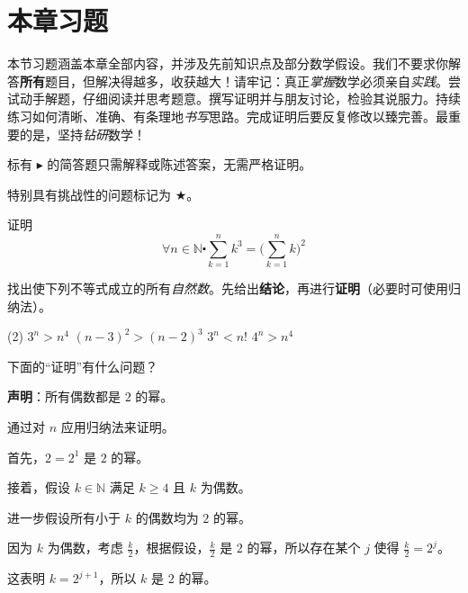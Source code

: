 \section{本章习题} \label{sec:section5.7}

本节习题涵盖本章全部内容，并涉及先前知识点及部分数学假设。我们不要求你解答\textbf{所有}题目，但解决得越多，收获越大！请牢记：真正\emph{掌握}数学必须亲自\emph{实践}。尝试动手解题，仔细阅读并思考题意。撰写证明并与朋友讨论，检验其说服力。持续练习如何清晰、准确、有条理地\emph{书写}思路。完成证明后要反复修改以臻完善。最重要的是，坚持\emph{钻研}数学！

标有 $\blacktriangleright$ 的简答题只需解释或陈述答案，无需严格证明。

特别具有挑战性的问题标记为 $\bigstar$。\\

\begin{exercise} \label{exc:exercises5.7.1}
    证明
    \[\forall n \in \mathbb{N} \centerdot \sum_{k=1}^{n} k^3 = \bigg(\sum_{k=1}^{n} k\bigg)^2\]
\end{exercise}

\begin{exercise}
    找出使下列不等式成立的所有\emph{自然数}。先给出\textbf{结论}，再进行\textbf{证明}（必要时可使用归纳法）。
    \begin{tasks}[label=(\alph*)](2)
        \task $3^n > n^4$
        \task $(n-3)^2 > (n-2)^3$
        \task $3^n < n!$
        \task $4^n > n^4$
    \end{tasks}
\end{exercise}

\begin{exercise}
    下面的``证明''有什么问题？

    \textbf{声明}：所有偶数都是 $2$ 的幂。

    \begin{center}
        \noindent
            \parbox{0.85\textwidth}{%
                \linespread{1.5}\selectfont
                通过对 $n$ 应用归纳法来证明。

                首先，$2=2^1$ 是 $2$ 的幂。

                接着，假设 $k \in \mathbb{N}$ 满足 $k \ge 4$ 且 $k$ 为偶数。
                
                进一步假设所有小于 $k$ 的偶数均为 $2$ 的幂。

                因为 $k$ 为偶数，考虑 $\frac{k}{2}$，根据假设，$\frac{k}{2}$ 是 $2$ 的幂，所以存在某个 $j$ 使得 $\frac{k}{2}=2^j$。

                这表明 $k = 2^{j+1}$，所以 $k$ 是 $2$ 的幂。 
            }
    \end{center}
\end{exercise}

